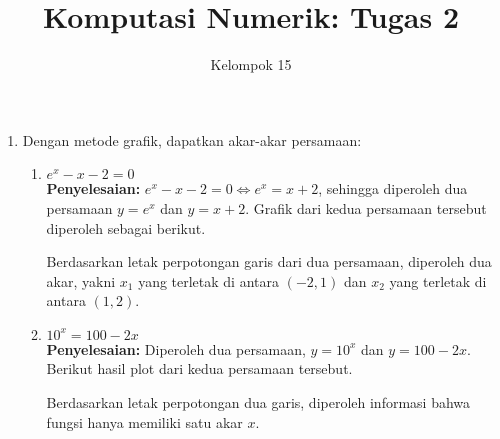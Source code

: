\documentclass{article}
\title{\textbf{Komputasi Numerik: Tugas 2}}
\author{Kelompok 15}
\date{}
\newcommand{\penyelesaian}{\textbf{Penyelesaian: }}
\begin{document}
\maketitle

\begin{enumerate}
    \item Dengan metode grafik, dapatkan akar-akar persamaan:
    \begin{enumerate}
        \item $e^x - x - 2 = 0$ \\
        \penyelesaian $e^x - x - 2 = 0 \Leftrightarrow e^x = x + 2$, sehingga diperoleh dua persamaan $y = e^x$ dan $y = x + 2$. 
        Grafik dari kedua persamaan tersebut diperoleh sebagai berikut.
        \begin{center}
        \end{center}
        Berdasarkan letak perpotongan garis dari dua persamaan, diperoleh dua akar, yakni $x_1$ yang terletak di antara $(-2, 1)$ dan $x_2$ yang terletak di antara $(1, 2)$.

        \item $10^x = 100 - 2x$ \\
        \penyelesaian Diperoleh dua persamaan, $y = 10^x$ dan $y = 100 - 2x$. Berikut hasil plot dari kedua persamaan tersebut.
        \begin{center}
        \end{center}
        Berdasarkan letak perpotongan dua garis, diperoleh informasi bahwa fungsi hanya memiliki satu akar $x$.


\end{enumerate}
\end{enumerate}
\end{document}
